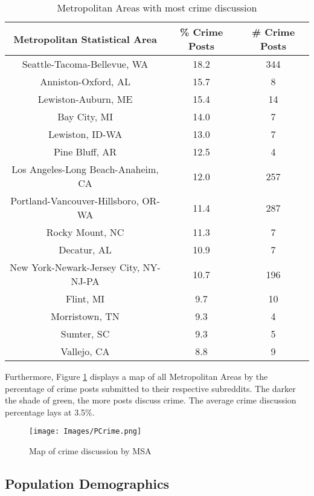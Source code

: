 \documentclass[12pt,oneside, letterpaper]{book}
\begin{document}
\begin{table}[h!]
    \centering
    \small
    \caption{Metropolitan Areas with most crime discussion}
    \begin{tabular}{| c | c | c |}
    \hline
    Metropolitan Statistical Area & \% Crime Posts & \# Crime Posts \\ \hline
    Seattle-Tacoma-Bellevue, WA & 18.2 & 344 \\ \hline
    Anniston-Oxford, AL & 15.7 & 8 \\ \hline
    Lewiston-Auburn, ME & 15.4 & 14 \\ \hline
    Bay City, MI & 14.0 & 7 \\ \hline
    Lewiston, ID-WA & 13.0 & 7 \\ \hline
    Pine Bluff, AR & 12.5 & 4 \\ \hline
    Los Angeles-Long Beach-Anaheim, CA & 12.0 & 257 \\ \hline
    Portland-Vancouver-Hillsboro, OR-WA & 11.4 & 287 \\ \hline
    Rocky Mount, NC & 11.3 & 7 \\ \hline
    Decatur, AL & 10.9 & 7 \\ \hline
    New York-Newark-Jersey City, NY-NJ-PA & 10.7 & 196 \\ \hline
    Flint, MI & 9.7 & 10 \\ \hline
    Morristown, TN & 9.3 & 4 \\ \hline
    Sumter, SC & 9.3 & 5 \\ \hline
    Vallejo, CA & 8.8 & 9 \\ \hline
	\end{tabular}
	\label{table:table-3}
\end{table}

\par Furthermore, Figure \ref{fig:map-1} displays a map of all Metropolitan Areas by the percentage of crime posts submitted to their respective subreddits. The darker the shade of green, the more posts discuss crime. The average crime discussion percentage lays at 3.5\%.

\begin{figure}[ht]
    \texttt{[image: Images/PCrime.png]}
    \caption{Map of crime discussion by MSA}
    \label{fig:map-1}
\end{figure}

\subsection{Population Demographics}
\end{document}

